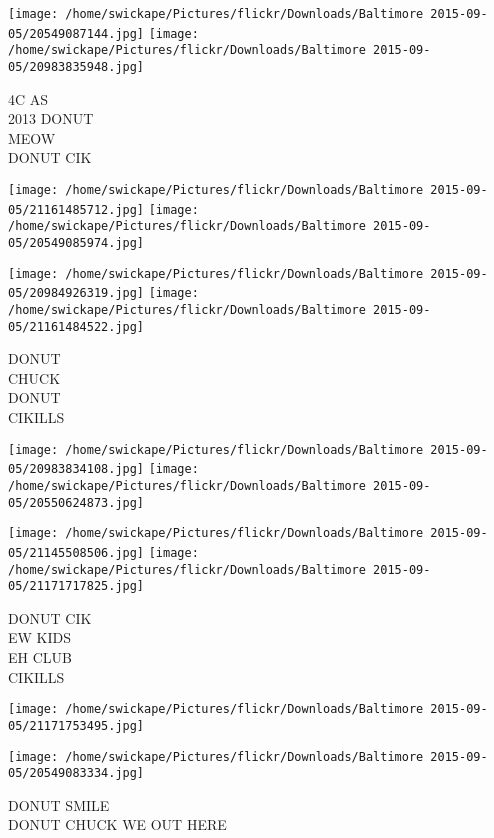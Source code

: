 \documentclass[10pt,letterpaper]{article}
\begin{document}
\texttt{[image: /home/swickape/Pictures/flickr/Downloads/Baltimore 2015-09-05/20549087144.jpg]}
\texttt{[image: /home/swickape/Pictures/flickr/Downloads/Baltimore 2015-09-05/20983835948.jpg]}

4C AS\\
2013 DONUT\\
MEOW\\
DONUT CIK\\
\pagebreak

\texttt{[image: /home/swickape/Pictures/flickr/Downloads/Baltimore 2015-09-05/21161485712.jpg]}
\texttt{[image: /home/swickape/Pictures/flickr/Downloads/Baltimore 2015-09-05/20549085974.jpg]}

\texttt{[image: /home/swickape/Pictures/flickr/Downloads/Baltimore 2015-09-05/20984926319.jpg]}
\texttt{[image: /home/swickape/Pictures/flickr/Downloads/Baltimore 2015-09-05/21161484522.jpg]}

DONUT\\
CHUCK\\
DONUT\\
CIKILLS\\
\pagebreak

\texttt{[image: /home/swickape/Pictures/flickr/Downloads/Baltimore 2015-09-05/20983834108.jpg]}
\texttt{[image: /home/swickape/Pictures/flickr/Downloads/Baltimore 2015-09-05/20550624873.jpg]}

\texttt{[image: /home/swickape/Pictures/flickr/Downloads/Baltimore 2015-09-05/21145508506.jpg]}
\texttt{[image: /home/swickape/Pictures/flickr/Downloads/Baltimore 2015-09-05/21171717825.jpg]}

DONUT CIK\\
EW KIDS\\
EH CLUB\\
CIKILLS\\
\pagebreak

\texttt{[image: /home/swickape/Pictures/flickr/Downloads/Baltimore 2015-09-05/21171753495.jpg]}

\vspace{0.25in}
\texttt{[image: /home/swickape/Pictures/flickr/Downloads/Baltimore 2015-09-05/20549083334.jpg]}

DONUT SMILE\\
DONUT CHUCK WE OUT HERE\\
\pagebreak
\end{document}
